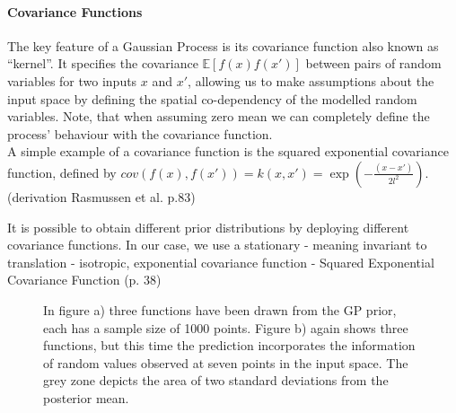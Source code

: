 \paragraph{Covariance Functions}
The key feature of a Gaussian Process is its covariance function also known as ``kernel''. It specifies the covariance $\mathbb{E}[f(x)f(x')]$ between pairs of random variables for two inputs $x$ and $x'$, allowing us to make assumptions about the input space by defining the spatial co-dependency of the modelled random variables. Note, that when assuming zero mean we can completely define the process' behaviour with the covariance function.\\
A simple example of a covariance function is the squared exponential covariance function, defined by $cov(f(x),f(x'))=k(x,x')=\exp(-\frac{(x-x')}{2l^{2}})$. (derivation Rasmussen et al. p.83) 
It is possible to obtain different prior distributions by deploying different covariance functions. In our case, we use a stationary - meaning invariant to translation - isotropic, exponential covariance function - Squared Exponential Covariance Function (p. 38)

\begin{figure}[h!]
\caption{In figure a) three functions have been drawn from the GP prior, each has a sample size of 1000 points. Figure b) again shows three functions, but this time the prediction incorporates the information of random values observed at seven points in the input space. The grey zone depicts the area of two standard deviations from the posterior mean.}
\label{fig:GPPlot}
\end{figure}

